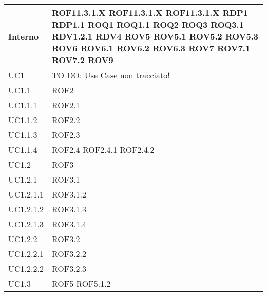 \begin{center}
\begin{longtable}{| p{4cm} | p{4cm} |}
\hline
Interno & ROF11.3.1.X \newline ROF11.3.1.X \newline ROF11.3.1.X \newline RDP1 \newline RDP1.1 \newline ROQ1 \newline ROQ1.1 \newline ROQ2 \newline ROQ3 \newline ROQ3.1 \newline RDV1.2.1 \newline RDV4 \newline ROV5 \newline ROV5.1 \newline ROV5.2 \newline ROV5.3 \newline ROV6 \newline ROV6.1 \newline ROV6.2 \newline ROV6.3 \newline ROV7 \newline ROV7.1 \newline ROV7.2 \newline ROV9 \newline \\
\hline
UC1 & TO DO: Use Case non tracciato! \\
\hline
UC1.1 & ROF2 \\
\hline
UC1.1.1 & ROF2.1 \\
\hline
UC1.1.2 & ROF2.2 \\
\hline
UC1.1.3 & ROF2.3 \\
\hline
UC1.1.4 & ROF2.4 \newline ROF2.4.1 \newline ROF2.4.2 \\
\hline
UC1.2 & ROF3 \\
\hline
UC1.2.1 & ROF3.1 \\
\hline
UC1.2.1.1 & ROF3.1.2 \\
\hline
UC1.2.1.2 & ROF3.1.3 \\
\hline
UC1.2.1.3 & ROF3.1.4 \\
\hline
UC1.2.2 & ROF3.2 \\
\hline
UC1.2.2.1 & ROF3.2.2 \\
\hline
UC1.2.2.2 & ROF3.2.3 \\
\hline
UC1.3 & ROF5 \newline ROF5.1.2 \\

\end{longtable}
\end{center}
